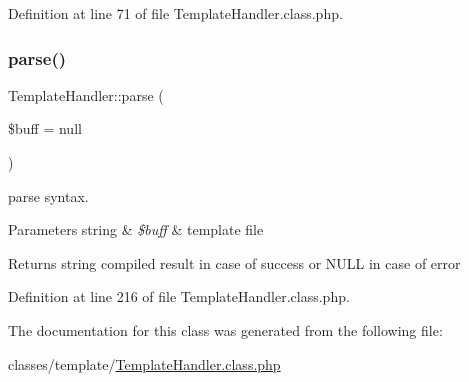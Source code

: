 Definition at line 71 of file Template\+Handler.\+class.\+php.

\hypertarget{classTemplateHandler_acf0023ac6383d43e9b0ab854c75c0694}{}\label{classTemplateHandler_acf0023ac6383d43e9b0ab854c75c0694} 
\subsubsection{\texorpdfstring{parse()}{parse()}}
{\footnotesize\ttfamily Template\+Handler\+::parse (\begin{DoxyParamCaption}\item[{}]{\$buff = {\ttfamily null} }\end{DoxyParamCaption})\hspace{0.3cm}{\ttfamily [protected]}}

parse syntax. 
\begin{DoxyParams}[1]{Parameters}
string & {\em \$buff} & template file \\
\hline
\end{DoxyParams}
\begin{DoxyReturn}{Returns}
string compiled result in case of success or N\+U\+LL in case of error 
\end{DoxyReturn}


Definition at line 216 of file Template\+Handler.\+class.\+php.



The documentation for this class was generated from the following file\+:\begin{DoxyCompactItemize}
\item 
classes/template/\hyperlink{TemplateHandler_8class_8php}{Template\+Handler.\+class.\+php}\end{DoxyCompactItemize}
